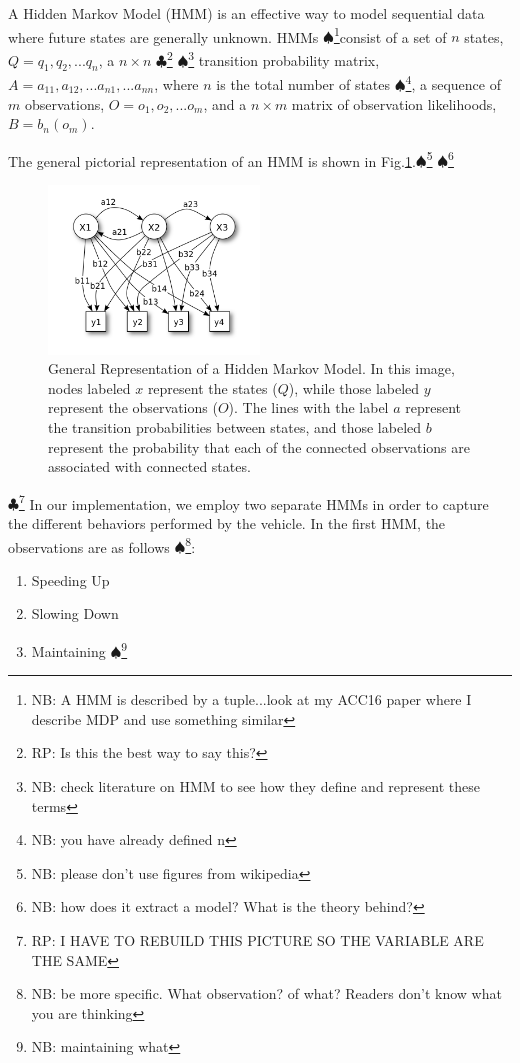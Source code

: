 \documentclass[conference]{IEEEtran}
\newcommand\NB[1]{$\spadesuit$\footnote{NB: #1}}
\newcommand\RP[1]{$\clubsuit$\footnote{RP: #1}}
\begin{document}
A Hidden Markov Model (HMM) is an effective way to model sequential data where future states are generally unknown. HMMs \NB{A HMM is described by a tuple...look at my ACC16 paper where I describe MDP and use something similar }consist of a set of $n$ states, $Q = q_1,q_2,...q_n$, a $n\times n$ \RP{Is this the best way to say this?} \NB{check literature on HMM to see how they define and represent these terms} transition probability matrix, $A = a_{11},a_{12},...a_{n1},...a_{nn}$, where $n$ is the total number of states \NB{you have already defined n}, a sequence of $m$ observations, $O = o_1,o_2,...o_m$, and a $n\times m$ matrix of observation likelihoods, $B = b_n(o_m)$. 

The general pictorial representation of an HMM is shown in Fig.\ref{fig:hmm}.\NB{please don't use figures from wikipedia}
\NB{how does it extract a model? What is the theory behind? }

\begin{figure}[ht]
    \includegraphics[width=0.5\textwidth]{hmmwiki.png}
    \caption{General Representation of a Hidden Markov Model. In this image, nodes labeled $x$ represent the states ($Q$), while those labeled $y$ represent the observations ($O$). The lines with the label $a$ represent the transition probabilities between states, and those labeled $b$ represent the probability that each of the connected observations are associated with connected states.}
    \label{fig:hmm}
\end{figure}
\RP{I HAVE TO REBUILD THIS PICTURE SO THE VARIABLE ARE THE SAME}
In our implementation, we employ two separate HMMs in order to capture the different behaviors performed by the vehicle. In the first HMM, the observations are as follows \NB{be more specific. What observation? of what? Readers don't know what you are thinking}:
\begin{enumerate}
    \item Speeding Up
    \item Slowing Down
    \item Maintaining \NB{maintaining what}
\end{enumerate}
\end{document}
